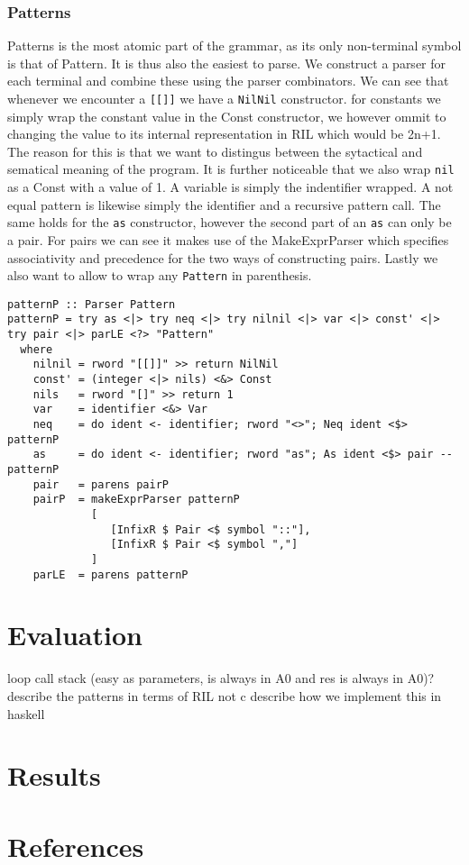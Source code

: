 \documentclass[a4paper]{article}
\begin{document}
\subsubsection{Patterns}
\label{sec:orgce5042b}
Patterns is the most atomic part of the grammar, as its only non-terminal symbol is that of Pattern. It is thus also the easiest to parse. We construct a parser for each terminal and combine these using the parser combinators.
We can see that whenever we encounter a \texttt{[[]]} we have a \texttt{NilNil} constructor. for constants we simply wrap the constant value in the Const constructor, we however ommit to changing the value to its internal representation in RIL which would be 2n+1. The reason for this is that we want to distingus between the sytactical and sematical meaning of the program. It is further noticeable that we also wrap \texttt{nil} as a Const with a value of 1.
A variable is simply the indentifier wrapped.
A not equal pattern is likewise simply the identifier and a recursive pattern call. The same holds for the \texttt{as} constructor, however the second part of an \texttt{as} can only be a pair. For pairs we can see it makes use of the MakeExprParser which specifies associativity and precedence for the two ways of constructing pairs.
Lastly we also want to allow to wrap any \texttt{Pattern} in parenthesis.
\begin{verbatim}
patternP :: Parser Pattern
patternP = try as <|> try neq <|> try nilnil <|> var <|> const' <|> try pair <|> parLE <?> "Pattern"
  where
    nilnil = rword "[[]]" >> return NilNil
    const' = (integer <|> nils) <&> Const
    nils   = rword "[]" >> return 1
    var    = identifier <&> Var
    neq    = do ident <- identifier; rword "<>"; Neq ident <$> patternP
    as     = do ident <- identifier; rword "as"; As ident <$> pair --patternP
    pair   = parens pairP
    pairP  = makeExprParser patternP
             [
                [InfixR $ Pair <$ symbol "::"],
                [InfixR $ Pair <$ symbol ","]
             ]
    parLE  = parens patternP
\end{verbatim}
\section{Evaluation}
\label{sec:org61e9d08}
loop
call stack (easy as parameters, is always in A0 and res is always in A0)?
describe the patterns in terms of RIL not c
describe how we implement this in haskell

\section{Results}
\label{sec:org04d107f}

\section{References}
\label{sec:org67358e9}
\end{document}
